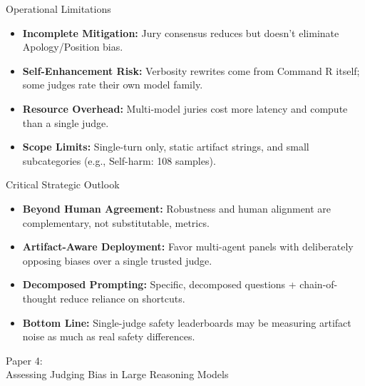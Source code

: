 \documentclass[10pt]{beamer}
\begin{document}
	\begin{frame}{Operational Limitations}
	\begin{itemize}
		\item \textbf{Incomplete Mitigation:} Jury consensus reduces but doesn't eliminate Apology/Position bias.
		\item \textbf{Self-Enhancement Risk:} Verbosity rewrites come from Command R itself; some judges rate their own model family.
		\item \textbf{Resource Overhead:} Multi-model juries cost more latency and compute than a single judge.
		\item \textbf{Scope Limits:} Single-turn only, static artifact strings, and small subcategories (e.g., Self-harm: 108 samples).
	\end{itemize}
	\end{frame}

	\begin{frame}{Critical Strategic Outlook}
	\begin{itemize}
		\item \textbf{Beyond Human Agreement:} Robustness and human alignment are complementary, not substitutable, metrics.
		\item \textbf{Artifact-Aware Deployment:} Favor multi-agent panels with deliberately opposing biases over a single trusted judge.
		\item \textbf{Decomposed Prompting:} Specific, decomposed questions + chain-of-thought reduce reliance on shortcuts.
		\item \textbf{Bottom Line:} Single-judge safety leaderboards may be measuring artifact noise as much as real safety differences.
	\end{itemize}
	\end{frame}

	\begin{frame}[standout]
		\hypertarget{paper4}{}
		\Large Paper 4:\\Assessing Judging Bias in Large Reasoning Models
	\end{frame}

\end{document}
